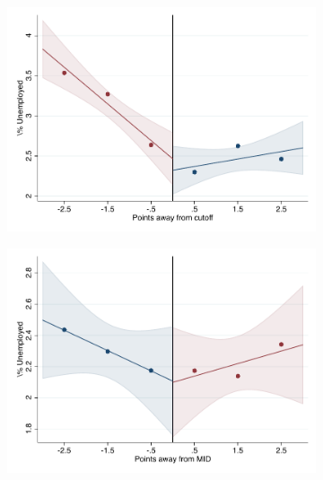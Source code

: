 \documentclass[oneside,11pt]{article}
\begin{document}
\begin{figure}[H]
\begin{center}
    \begin{subfigure}{0.475\textwidth}
        \centering
        \includegraphics[width=\textwidth]{04_Figures/rd_plot_tau_Unemployed_IPN3.pdf}
    \end{subfigure}
    \begin{subfigure}{0.475\textwidth}
        \centering
        \includegraphics[width=\textwidth]{04_Figures/rd_plot_mid_Unemployed_IPN3.pdf}
    \end{subfigure}


\end{center}
\end{figure}
\end{document}
